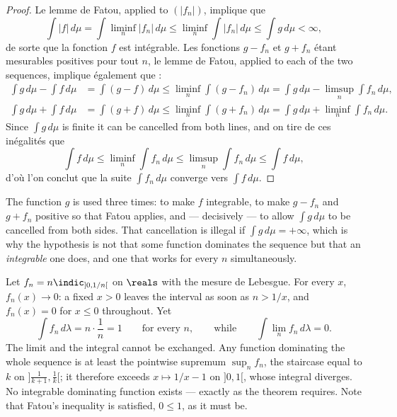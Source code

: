 \begin{proof}
  Le lemme de Fatou, applied to $(|f_{n}|)$, implique que
  \[
    \int |f| \, d\mu = \int \liminf_{n} |f_{n}| \, d\mu
    \leq \liminf_{n} \int |f_{n}| \, d\mu \leq \int g \, d\mu < \infty ,
  \]
  de sorte que la fonction $f$ est intégrable. Les fonctions $g - f_{n}$ et $g +
  f_{n}$ étant mesurables positives pour tout $n$, le lemme de Fatou, applied to each
  of the two sequences, implique également que :
  \begin{align*}
    \int g \, d\mu - \int f \, d\mu &= \int (g - f) \, d\mu
      \leq \liminf_{n} \int (g - f_{n}) \, d\mu
      = \int g \, d\mu - \limsup_{n} \int f_{n} \, d\mu , \\
    \int g \, d\mu + \int f \, d\mu &= \int (g + f) \, d\mu
      \leq \liminf_{n} \int (g + f_{n}) \, d\mu
      = \int g \, d\mu + \liminf_{n} \int f_{n} \, d\mu .
  \end{align*}
  Since $\int g \, d\mu$ is finite it can be cancelled from both lines, and on tire de
  ces inégalités que
  \[
    \int f \, d\mu \leq \liminf_{n} \int f_{n} \, d\mu
    \leq \limsup_{n} \int f_{n} \, d\mu \leq \int f \, d\mu ,
  \]
  d'où l'on conclut que la suite $\int f_{n} \, d\mu$ converge vers $\int f \,
  d\mu$.
\end{proof}

\begin{remark}
  The function $g$ is used three times: to make $f$ integrable, to make $g - f_{n}$
  and $g + f_{n}$ positive so that Fatou applies, and --- decisively --- to allow
  $\int g \, d\mu$ to be cancelled from both sides. That cancellation is illegal if
  $\int g \, d\mu = +\infty$, which is why the hypothesis is not that some function
  dominates the sequence but that an \emph{integrable} one does, and one that works
  for every $n$ simultaneously.
\end{remark}

\begin{example}
  Let $f_{n} = n \indic_{]0,1/n[}$ on $\reals$ with the mesure de Lebesgue. For every
  $x$, $f_{n}(x) \to 0$: a fixed $x > 0$ leaves the interval as soon as $n > 1/x$,
  and $f_{n}(x) = 0$ for $x \leq 0$ throughout. Yet
  \[
    \int f_{n} \, d\lambda = n \cdot \frac{1}{n} = 1
    \qquad \text{for every } n, \qquad \text{while} \qquad
    \int \lim_{n} f_{n} \, d\lambda = 0 .
  \]
  The limit and the integral cannot be exchanged. Any function dominating the whole
  sequence is at least the pointwise supremum $\sup_{n} f_{n}$, the staircase equal
  to $k$ on $]\frac{1}{k+1},\frac{1}{k}[$; it therefore exceeds $x \mapsto 1/x - 1$
  on $]0,1[$, whose integral diverges. No integrable dominating function exists ---
  exactly as the theorem requires. Note
  that Fatou's inequality is satisfied, $0 \leq 1$, as it must be.
\end{example}

